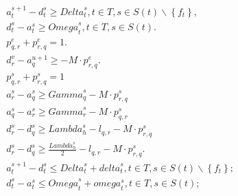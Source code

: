 \begin{align}
  & a_{t}^{s + 1} - d_{t}^{s} \geq \mathit{Delta}_{t}^{s} , t \in T , s \in S \left(t\right) \backslash \left\{f_{t}\right\} , \tag{eq\_0001} \\
  & d_{t}^{s} - a_{t}^{s} \geq \mathit{Omega}_{t}^{s} , t \in T , s \in S \left(t\right) . \tag{eq\_0002} \\
  & p_{q , r}^{e} + p_{r , q}^{e} = 1 . \tag{eq\_0003} \\
  & d_{r}^{v} - a_{q}^{u + 1} \geq - M \cdot p_{r , q}^{e} . \tag{eq\_0004} \\
  & p_{q , r}^{s} + p_{r , q}^{s} = 1 \tag{eq\_0005\_a} \\
  & a_{r}^{s} - a_{q}^{s} \geq \mathit{Gamma}_{q}^{s} - M \cdot p_{r , q}^{s} \tag{eq\_0007\_a} \\
  & a_{q}^{s} - a_{r}^{s} \geq \mathit{Gamma}_{r}^{s} - M \cdot p_{q , r}^{s} \tag{eq\_0007\_b} \\
  & d_{r}^{s} - d_{q}^{s} \geq \mathit{Lambda}_{h}^{s} - l_{q , r} - M \cdot p_{r , q}^{s} \tag{eq\_0009} \\
  & d_{r}^{s} - d_{q}^{s} \geq \frac{\mathit{Lambda}_{h}^{s}}{2} - l_{q , r} - M \cdot p_{r , q}^{s} . \tag{eq\_0010} \\
  & a_{t}^{s + 1} - d_{t}^{s} \leq \mathit{Delta}_{t}^{s} + \mathit{delta}_{t}^{s} , t \in T , s \in S \left(t\right) \backslash \left\{f_{t}\right\} ; \tag{eq\_0014} \\
  & d_{t}^{s} - a_{t}^{s} \leq \mathit{Omega}_{t}^{s} + \mathit{omega}_{t}^{s} , t \in T , s \in S \left(t\right) ; \tag{eq\_0015} \\
\end{align}
